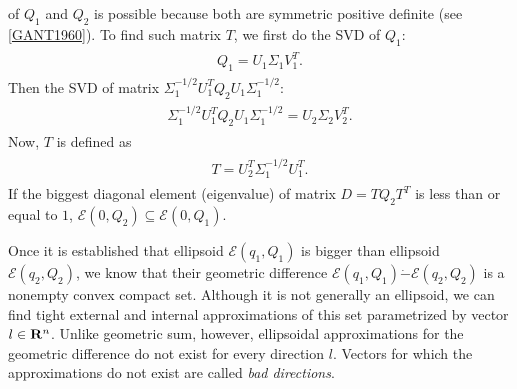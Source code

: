 \documentclass[letterpaper,10pt,english]{sphinxmanual}
\begin{document}
of $Q_1$ and $Q_2$ is possible because both are symmetric
positive definite (see {\hyperref[main_source:gant1960]{{[}GANT1960{]}}}). To find such matrix
$T$, we first do the SVD of $Q_1$:
\label{main_source:equation-simdiag1}\begin{gather}
\begin{split}Q_1 = U_1\Sigma_1V_1^T .\end{split}\label{main_source-simdiag1}
\end{gather}
Then the SVD of matrix
$\Sigma_1^{-1/2}U_1^TQ_2U_1\Sigma_1^{-1/2}$:
\label{main_source:equation-simdiag2}\begin{gather}
\begin{split}\Sigma_1^{-1/2}U_1^TQ_2U_1\Sigma_1^{-1/2} = U_2\Sigma_2V_2^T.\end{split}\label{main_source-simdiag2}
\end{gather}
Now, $T$ is defined as
\label{main_source:equation-simdiag3}\begin{gather}
\begin{split}T = U_2^T \Sigma_1^{-1/2}U_1^T.\end{split}\label{main_source-simdiag3}
\end{gather}
If the biggest diagonal element (eigenvalue) of matrix $D=TQ_2T^T$
is less than or equal to $1$,
${\mathcal E}(0,Q_2)\subseteq{\mathcal E}(0,Q_1)$.

Once it is established that ellipsoid ${\mathcal E}(q_1,Q_1)$ is
bigger than ellipsoid ${\mathcal E}(q_2,Q_2)$, we know that their
geometric difference
${\mathcal E}(q_1,Q_1)\dot{-}{\mathcal E}(q_2,Q_2)$ is a nonempty
convex compact set. Although it is not generally an ellipsoid, we can
find tight external and internal approximations of this set parametrized
by vector $l\in{\bf R}^n$. Unlike geometric sum, however,
ellipsoidal approximations for the geometric difference do not exist for
every direction $l$. Vectors for which the approximations do not
exist are called \emph{bad directions}.
\end{document}
